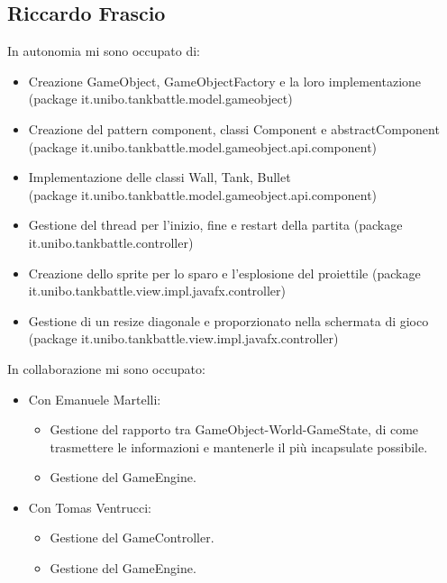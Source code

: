 \documentclass[a4paper,12pt]{report}
\begin{document}
\subsection*{Riccardo Frascio}
In autonomia mi sono occupato di:
\begin{itemize}
	\item Creazione GameObject, GameObjectFactory e la loro implementazione (package it.unibo.tankbattle.model.gameobject)
	\item Creazione del pattern component, classi Component e abstractComponent (package it.unibo.tankbattle.model.gameobject.api.component)
    \item Implementazione delle classi Wall, Tank, Bullet \\
(package it.unibo.tankbattle.model.gameobject.api.component)
	\item Gestione del thread per l’inizio, fine e restart della partita (package it.unibo.tankbattle.controller)
    \item Creazione dello sprite per lo sparo e l’esplosione del proiettile (package it.unibo.tankbattle.view.impl.javafx.controller)
    \item Gestione di un resize diagonale e proporzionato nella schermata di gioco (package it.unibo.tankbattle.view.impl.javafx.controller)
\end{itemize}
In collaborazione mi sono occupato:
\begin{itemize}
	\item Con Emanuele Martelli:
        \begin{itemize}
	\item Gestione del rapporto tra GameObject-World-GameState, di come trasmettere le informazioni e mantenerle il più incapsulate possibile.
    \item Gestione del GameEngine.
        \end{itemize}
        \item Con Tomas Ventrucci:
        \begin{itemize}
	\item Gestione del GameController.
    \item Gestione del GameEngine.
        \end{itemize}
\end{itemize}
\end{document}
